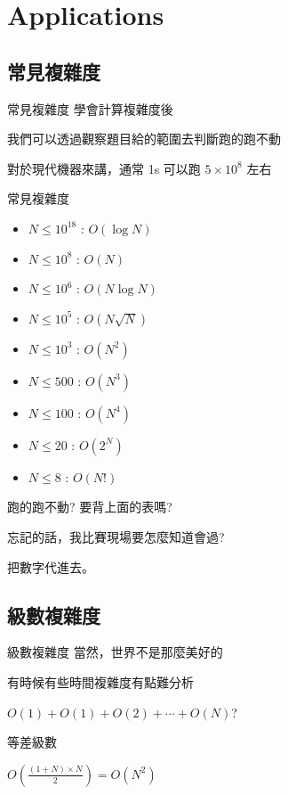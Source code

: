 \section{Applications}

\subsection{常見複雜度}

\begin{frame}{常見複雜度}
    學會計算複雜度後
    
    我們可以透過觀察題目給的範圍去判斷跑的跑不動\pause

    對於現代機器來講，通常 1s 可以跑 $5 \times 10^8$ 左右
\end{frame}

\begin{frame}{常見複雜度}
    \begin{itemize}
        \item $N \le 10^{18}$ : $O(\log{N})$\pause
        \item $N \le 10^8$ : $O(N)$\pause
        \item $N \le 10^6$ : $O(N \log{N})$\pause
        \item $N \le 10^5$ : $O(N \sqrt{N})$\pause
        \item $N \le 10^3$ : $O(N^2)$\pause
        \item $N \le 500$ : $O(N^3)$\pause
        \item $N \le 100$ : $O(N^4)$\pause
        \item $N \le 20$ : $O(2^N)$\pause
        \item $N \le 8$ : $O(N!)$
    \end{itemize}
\end{frame}

\begin{frame}{跑的跑不動?}
    要背上面的表嗎?\pause

    忘記的話，我比賽現場要怎麼知道會過?\pause

    把數字代進去。
\end{frame}

\subsection{級數複雜度}

\begin{frame}{級數複雜度}
    當然，世界不是那麼美好的

    有時候有些時間複雜度有點難分析\pause

    $O(1) + O(1) + O(2) + \cdots + O(N)$?\pause

    等差級數

    $\displaystyle O(\frac{(1 + N) \times N}{2}) = O(N^2)$
\end{frame}

